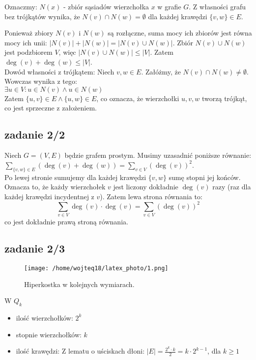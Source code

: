 \documentclass{article}
\begin{document}
Oznaczmy: $N(x)$ - zbiór sąsiadów wierzchołka $x$ w grafie $G$. Z własności grafu bez trójkątów wynika, że $N(v) \cap N(w) = \emptyset$ dla każdej krawędzi $\{v, w\} \in E$.

Ponieważ zbiory $N(v)$ i $N(w)$ są rozłączne, suma mocy ich zbiorów jest równa mocy ich unii: $|N(v)| + |N(w)| = |N(v) \cup N(w)|$. Zbiór $N(v) \cup N(w)$ jest podzbiorem $V$, więc $|N(v) \cup N(w)| \leq |V|$.
Zatem $\deg(v) + \deg(w) \leq |V|$. \\

Dowód własności z trójkątem:
Niech ${v, w} \in E$. Załóżmy, że $N(v) \cap N(w) \neq \emptyset$. Wowczas wynika z tego: \\
$\exists u \in V: u \in N(v) \land u \in N(w)$ \\
Zatem $\{u, v\} \in E \land \{u, w\} \in E$, co oznacza, że wierzchołki $u, v, w$ tworzą trójkąt, co jest sprzeczne z założeniem.

\subsection*{zadanie 2/2}
Niech $G = (V, E)$ będzie grafem prostym. Musimy uzasadnić poniższe równanie:
$\sum_{\{v, w\} \in E} (\deg(v) + \deg(w)) = \sum_{v \in V} (\deg(v))^2$. \\
Po lewej stronie sumujemy dla każdej krawędzi $\{v, w\}$ sumę stopni jej końców. Oznacza to, że każdy wierzchołek $v$ jest liczony dokładnie $\deg(v)$ razy (raz dla każdej krawędzi incydentnej z $v$). Zatem lewa strona równania to:
\[\sum_{v \in V} \deg(v) \cdot \deg(v) = \sum_{v \in V} (\deg(v))^2\]
co jest dokładnie prawą stroną równania.

\newpage

\subsection*{zadanie 2/3}
\begin{figure}[h!]
    \centering
    \texttt{[image: /home/wojteq18/latex\_photo/1.png]}
    \caption{Hiperkostka w kolejnych wymiarach.}
    \label{fig:obrazek1}
\end{figure}

W $Q_{k}$
\begin{itemize}
    \item ilość wierzchołków: $2^k$
    \item stopnie wierzchołków: $k$
    \item ilość krawędzi: Z lematu o uściskach dłoni: $|E| = \frac{2^k \cdot k}{2} = k \cdot 2^{k-1}$, dla $ k \geq 1$
\end{itemize}
\end{document}

